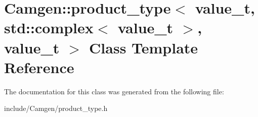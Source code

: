 \hypertarget{a00434}{\section{Camgen\-:\-:product\-\_\-type$<$ value\-\_\-t, std\-:\-:complex$<$ value\-\_\-t $>$, value\-\_\-t $>$ Class Template Reference}
\label{a00434}
}


The documentation for this class was generated from the following file\-:\begin{DoxyCompactItemize}
\item 
include/\-Camgen/product\-\_\-type.\-h\end{DoxyCompactItemize}

